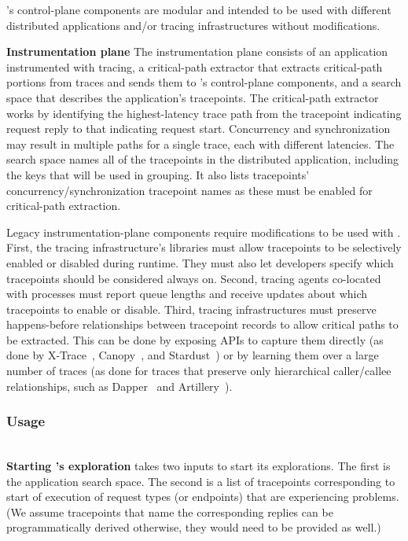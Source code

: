   \STAIF{}'s control-plane components are modular and intended to
  be used with different distributed applications and/or
  tracing infrastructures without modifications.
  
  \noindent\textbf{Instrumentation plane} The instrumentation plane
  consists of an application instrumented with tracing, a critical-path
  extractor that extracts critical-path portions from traces and sends
  them to \STAIF{}'s control-plane components, and a search space that
  describes the application's tracepoints.  The critical-path extractor
  works by identifying the highest-latency trace path from the
  tracepoint indicating request reply to that indicating request start.
  Concurrency and synchronization may result in multiple paths for a
  single trace, each with different latencies.  The search space names
  all of the tracepoints in the distributed application, including the
  keys that will be used in grouping.  It also lists tracepoints'
  concurrency/synchronization tracepoint names as these must be enabled
  for critical-path extraction.
  
  Legacy instrumentation-plane components require modifications to be
  used with \STAIF{}.  First, the tracing
  infrastructure's libraries must allow tracepoints to be selectively
  enabled or disabled during runtime.  They must also let developers
  specify which tracepoints should be considered always on. Second,
  tracing agents co-located with processes must report queue lengths and
  receive updates about which tracepoints to enable or disable. Third,
  tracing infrastructures must preserve happens-before relationships
  between tracepoint records to allow critical paths to be
  extracted. This can be done by exposing APIs to capture them directly
  (as done by X-Trace~\cite{Fonseca:2010vn, Mace:ui},
  Canopy~\cite{Kaldor:2017gp}, and Stardust~\cite{Sambasivan:2011vw}) or
  by learning them over a large number of traces (as done for traces
  that preserve only hierarchical caller/callee relationships, such as
  Dapper~\cite{Mann:2011vf} and Artillery~\cite{Chow:2014ts}).
  
  \vspace{-0.05in}
  \subsubsection{Usage}
  \label{sec:design:init}
  \hfill\\
  \noindent\textbf{Starting \STAIF{}'s exploration} \STAIF{} takes 
  two inputs to start its explorations.  The first is the application
  search space.  The second is a list of tracepoints corresponding to start
  of execution of request types (or endpoints) that are experiencing
  problems.  (We assume tracepoints that name the corresponding replies
  can be programmatically derived otherwise, they would need to be
  provided as well.)
  
